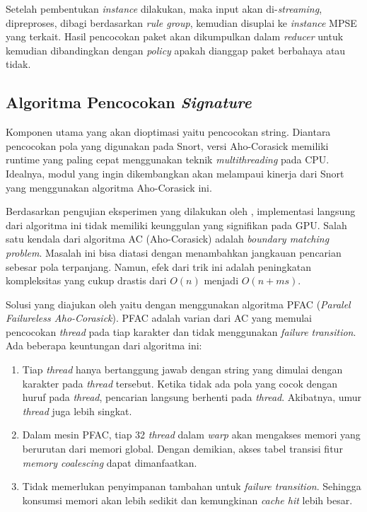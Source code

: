       Setelah pembentukan \emph{instance} dilakukan, maka input akan di-\emph{streaming}, dipreproses, dibagi berdasarkan \emph{rule group}, kemudian disuplai ke \emph{instance} MPSE yang terkait. Hasil pencocokan paket akan dikumpulkan dalam \emph{reducer} untuk kemudian dibandingkan dengan \emph{policy} apakah dianggap paket berbahaya atau tidak.

    \subsection{Algoritma Pencocokan \emph{Signature}}

      Komponen utama yang akan dioptimasi yaitu pencocokan string. Diantara pencocokan pola yang digunakan pada Snort, versi Aho-Corasick memiliki runtime yang paling cepat menggunakan teknik \emph{multithreading} pada CPU. Idealnya, modul yang ingin dikembangkan akan melampaui kinerja dari Snort yang menggunakan algoritma Aho-Corasick ini.
      
      Berdasarkan pengujian eksperimen yang dilakukan oleh \cite{lin2013}, implementasi langsung dari algoritma ini tidak memiliki keunggulan yang signifikan pada GPU. Salah satu kendala dari algoritma AC (Aho-Corasick) adalah \emph{boundary matching problem}. Masalah ini bisa diatasi dengan menambahkan jangkauan pencarian sebesar pola terpanjang. Namun, efek dari trik ini adalah peningkatan kompleksitas yang cukup drastis dari $O(n)$ menjadi $O(n + ms)$. 
      
      Solusi yang diajukan oleh \cite{lin2013} yaitu dengan menggunakan algoritma PFAC (\emph{Paralel Failureless Aho-Corasick}). PFAC adalah varian dari AC yang memulai pencocokan \emph{thread} pada tiap karakter dan tidak menggunakan \emph{failure transition}. Ada beberapa keuntungan dari algoritma ini:
    
      \begin{enumerate}

        \item 
        Tiap \emph{thread} hanya bertanggung jawab dengan string yang dimulai dengan karakter pada \emph{thread} tersebut. Ketika tidak ada pola yang cocok dengan huruf pada \emph{thread}, pencarian langsung berhenti pada \emph{thread}. Akibatnya, umur \emph{thread} juga lebih singkat.
        
        \item 
        Dalam mesin PFAC, tiap 32 \emph{thread} dalam \emph{warp} akan mengakses memori yang berurutan dari memori global. Dengan demikian, akses tabel transisi fitur \emph{memory coalescing} dapat dimanfaatkan.
        
        \item
        Tidak memerlukan penyimpanan tambahan untuk \emph{failure transition}. Sehingga konsumsi memori akan lebih sedikit dan kemungkinan \emph{cache hit} lebih besar.
        
      \end{enumerate}
      
